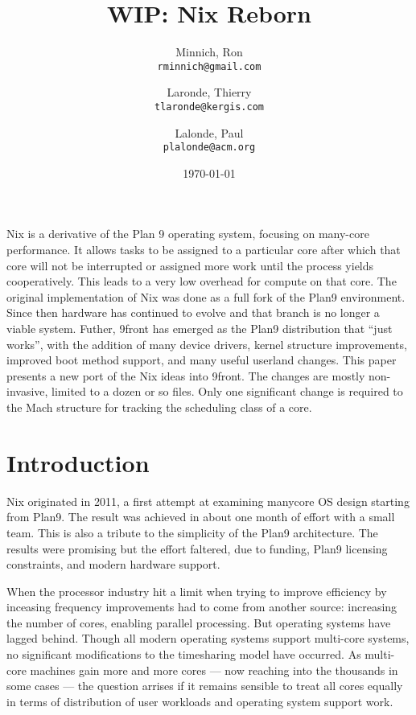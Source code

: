 \documentclass{article}
\title{WIP: Nix Reborn}
\author{Minnich, Ron\\
	\texttt{rminnich@gmail.com}
	\and
	Laronde, Thierry\\
	\texttt{tlaronde@kergis.com}
	\and
	Lalonde, Paul\\
	\texttt{plalonde@acm.org}
	}
\date{\today}
\begin{document}
 
\newcommand{\PAL}[1]{{\em PAL: #1}}
\maketitle 
\abstract
Nix is a derivative of the Plan 9 operating system\cite{Pike:19xx:PBL}, focusing on many-core performance. It allows tasks to be assigned to a particular core after which
that core will not be interrupted or assigned more work until the process yields cooperatively.  This leads to a very low overhead for compute on that core.
The original implementation of Nix \cite{Ballesteros2012} was done as a full fork of the Plan9 environment.  Since then hardware has continued to evolve and
that branch is no longer a viable system.
Futher, 9front has emerged as the Plan9 distribution that ``just works'', with the addition of many device drivers, kernel structure improvements, improved
 boot method support, and many useful userland changes.
This paper presents a new port of the Nix ideas into 9front.  The changes are mostly non-invasive, limited to a dozen or so files.  Only one significant change is required to the Mach structure for tracking the scheduling class of a core.

\section{Introduction}
Nix originated in 2011, a first attempt at examining manycore OS design starting from Plan9.
The result was achieved in about one month of effort with a small team\cite{Ballesteros2012}.  This is also a tribute to the simplicity of the Plan9
architecture. %
The results were promising but the effort faltered, due to funding, Plan9 licensing constraints, and modern hardware support.

When the processor industry hit a limit when trying to improve efficiency by inceasing frequency improvements had to come from
another source: increasing the number of cores, enabling parallel processing.
But operating systems have lagged behind.
Though all modern operating systems support multi-core systems, no significant modifications to the timesharing model have occurred.
As multi-core machines gain more and more cores --- now reaching into the thousands in some cases \cite{Ditzel2022} --- the question arrises if it remains sensible to treat all cores equally in terms of distribution of user workloads and operating system support work.
\end{document}
